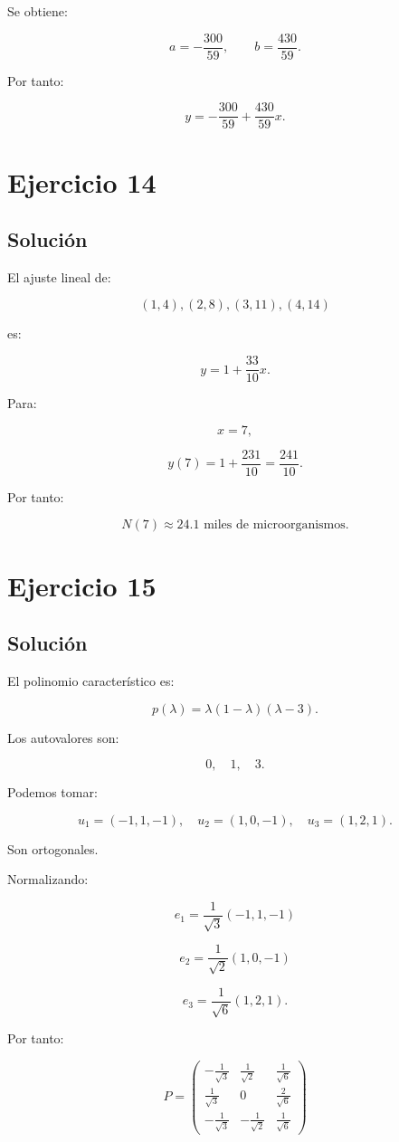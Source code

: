 \documentclass[11pt,a4paper]{article}
\begin{document}
Se obtiene:

\[
a=-\frac{300}{59},
\qquad
b=\frac{430}{59}.
\]

Por tanto:

\[
\boxed{
y=
-\frac{300}{59}
+
\frac{430}{59}x.
}
\]

\section{Ejercicio 14}
\subsection{Solución}

El ajuste lineal de:

\[
(1,4),(2,8),(3,11),(4,14)
\]

es:

\[
\boxed{
y=1+\frac{33}{10}x.
}
\]

Para:

\[
x=7,
\]

\[
y(7)
=
1+\frac{231}{10}
=
\frac{241}{10}.
\]

Por tanto:

\[
\boxed{
N(7)\approx24.1
\text{ miles de microorganismos}.
}
\]

\section{Ejercicio 15}
\subsection{Solución}

El polinomio característico es:

\[
p(\lambda)
=
\lambda(1-\lambda)(\lambda-3).
\]

Los autovalores son:

\[
0,\quad1,\quad3.
\]

Podemos tomar:

\[
u_1=(-1,1,-1),
\quad
u_2=(1,0,-1),
\quad
u_3=(1,2,1).
\]

Son ortogonales.

Normalizando:

\[
e_1=
\frac1{\sqrt3}(-1,1,-1)
\]

\[
e_2=
\frac1{\sqrt2}(1,0,-1)
\]

\[
e_3=
\frac1{\sqrt6}(1,2,1).
\]

Por tanto:

\[
\boxed{
P=
\begin{pmatrix}
-\frac1{\sqrt3}&\frac1{\sqrt2}&\frac1{\sqrt6}\\
\frac1{\sqrt3}&0&\frac2{\sqrt6}\\
-\frac1{\sqrt3}&-\frac1{\sqrt2}&\frac1{\sqrt6}
\end{pmatrix}
}
\]
\end{document}
